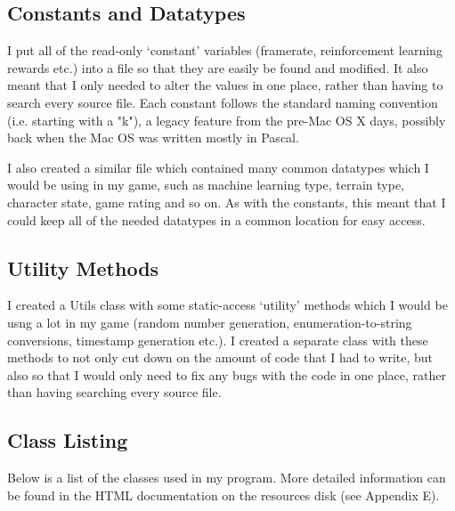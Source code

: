 \documentclass[a4paper,oneside]{report}
\begin{document}
\subsection{Constants and Datatypes} 

I put all of the read-only `constant' variables (framerate, reinforcement learning rewards etc.) into a file so that they are easily be found and modified. It also meant that I only needed to alter the values in one place, rather than having to search every source file. Each constant follows the standard naming convention (i.e. starting with a "k"), a legacy feature from the pre-Mac OS X days, possibly back when the Mac OS was written mostly in Pascal. 

I also created a similar file which contained many common datatypes which I would be using in my game, such as machine learning type, terrain type, character state, game rating and so on. As with the constants, this meant that I could keep all of the needed datatypes in a common location for easy access.

\subsection{Utility Methods} 

I created a Utils class with some static-access `utility' methods which I would be usng a lot in my game (random number generation, enumeration-to-string conversions, timestamp generation etc.). I created a separate class with these methods to not only cut down on the amount of code that I had to write, but also so that I would only need to fix any bugs with the code in one place, rather than having searching every source file. 

\subsection{Class Listing}

Below is a list of the classes used in my program. More detailed information can be found in the HTML documentation on the resources disk (see Appendix E).
\end{document}
